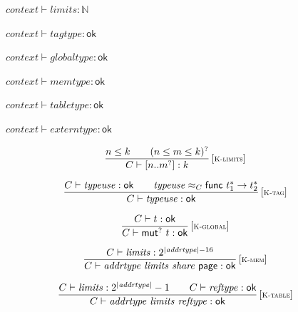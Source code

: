 $\boxed{{\mathit{context}} \vdash {\mathit{limits}} : \mathbb{N}}$

$\boxed{{\mathit{context}} \vdash {\mathit{tagtype}} : \mathsf{ok}}$

$\boxed{{\mathit{context}} \vdash {\mathit{globaltype}} : \mathsf{ok}}$

$\boxed{{\mathit{context}} \vdash {\mathit{memtype}} : \mathsf{ok}}$

$\boxed{{\mathit{context}} \vdash {\mathit{tabletype}} : \mathsf{ok}}$

$\boxed{{\mathit{context}} \vdash {\mathit{externtype}} : \mathsf{ok}}$

\vspace{1ex}

$$
\begin{array}{@{}c@{}}\displaystyle
\frac{
n \leq k
 \qquad
(n \leq m \leq k)^?
}{
C \vdash {}[ n .. {m^?} ] : k
} \, {[\textsc{\scriptsize K{-}limits}]}
\qquad
\end{array}
$$

$$
\begin{array}{@{}c@{}}\displaystyle
\frac{
C \vdash {\mathit{typeuse}} : \mathsf{ok}
 \qquad
{\mathit{typeuse}} \approx_{C} \mathsf{func}~{t_1^\ast} \rightarrow {t_2^\ast}
}{
C \vdash {\mathit{typeuse}} : \mathsf{ok}
} \, {[\textsc{\scriptsize K{-}tag}]}
\qquad
\end{array}
$$

$$
\begin{array}{@{}c@{}}\displaystyle
\frac{
C \vdash t : \mathsf{ok}
}{
C \vdash {\mathsf{mut}^?}~t : \mathsf{ok}
} \, {[\textsc{\scriptsize K{-}global}]}
\qquad
\end{array}
$$

$$
\begin{array}{@{}c@{}}\displaystyle
\frac{
C \vdash {\mathit{limits}} : {2^{{|{\mathit{addrtype}}|} - 16}}
}{
C \vdash {\mathit{addrtype}}~{\mathit{limits}}~{\mathit{share}}~\mathsf{page} : \mathsf{ok}
} \, {[\textsc{\scriptsize K{-}mem}]}
\qquad
\end{array}
$$

$$
\begin{array}{@{}c@{}}\displaystyle
\frac{
C \vdash {\mathit{limits}} : {2^{{|{\mathit{addrtype}}|}}} - 1
 \qquad
C \vdash {\mathit{reftype}} : \mathsf{ok}
}{
C \vdash {\mathit{addrtype}}~{\mathit{limits}}~{\mathit{reftype}} : \mathsf{ok}
} \, {[\textsc{\scriptsize K{-}table}]}
\qquad
\end{array}
$$

\vspace{1ex}


